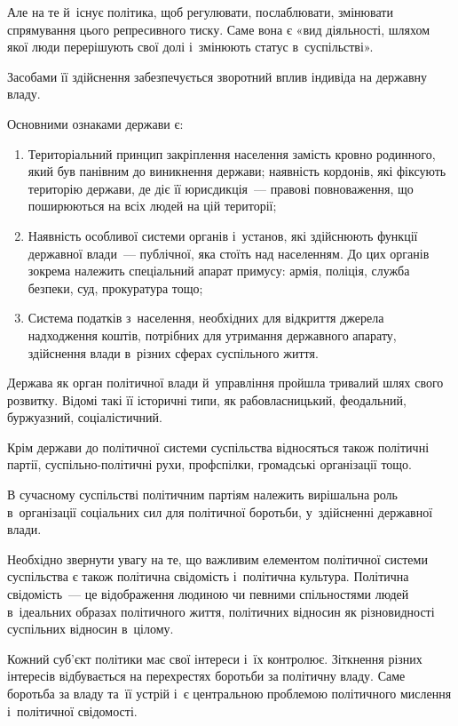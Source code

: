 \documentclass[a5paper,oneside,DIV=12,12pt,headings=small]{scrartcl}
\begin{document}
	Але на те й~існує політика, щоб регулювати, послаблювати, змінювати спрямування цього репресивного тиску. Саме вона є «вид діяльності, шляхом якої люди перерішують свої долі і~змінюють статус в~суспільстві».
	
	Засобами її здійснення забезпечується зворотний вплив індивіда на державну владу.
	
	Основними ознаками держави є:
	\begin{enumerate}
		\item Територіальний принцип закріплення населення замість кровно родинного, який був панівним до виникнення держави; наявність кордонів, які фіксують територію держави, де діє її юрисдикція~— правові повноваження, що поширюються на всіх людей на цій території;
		\item Наявність особливої системи органів і~установ, які здійснюють функції державної влади~— публічної, яка стоїть над населенням. До цих органів зокрема належить спеціальний апарат примусу: армія, поліція, служба безпеки, суд, прокуратура тощо;
		\item Система податків з~населення, необхідних для відкриття джерела надходження коштів, потрібних для утримання державного апарату, здійснення влади в~різних сферах суспільного життя.
	\end{enumerate}

	Держава як орган політичної влади й~управління пройшла тривалий шлях свого розвитку. Відомі такі її історичні типи, як рабовласницький, феодальний, буржуазний, соціалістичний.
	
	Крім держави до політичної системи суспільства відносяться також політичні партії, суспільно-політичні рухи, профспілки, громадські організації тощо.
	
	В сучасному суспільстві політичним партіям належить вирішальна роль в~організації соціальних сил для політичної боротьби, у~здійсненні державної влади.
	
	Необхідно звернути увагу на те, що важливим елементом політичної системи суспільства є також політична свідомість і~політична культура. Політична свідомість~— це відображення людиною чи певними спільностями людей в~ідеальних образах політичного життя, політичних відносин як різновидності суспільних відносин в~цілому.
	
	Кожний суб'\-єкт політики має свої інтереси і~їх контролює. Зіткнення різних інтересів відбувається на перехрестях боротьби за політичну владу. Саме боротьба за владу та~її устрій і~є центральною проблемою політичного мислення і~політичної свідомості.
	
\end{document}
